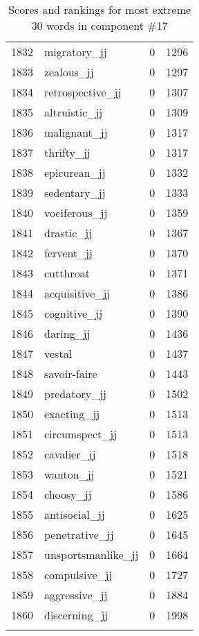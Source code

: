 \begin{longtable}[!htbp]{| rlr@{.}l |}
    1832 & migratory\_jj & 0 & 1296 \\
    1833 & zealous\_jj & 0 & 1297 \\
    1834 & retrospective\_jj & 0 & 1307 \\
    1835 & altruistic\_jj & 0 & 1309 \\
    1836 & malignant\_jj & 0 & 1317 \\
    1837 & thrifty\_jj & 0 & 1317 \\
    1838 & epicurean\_jj & 0 & 1332 \\
    1839 & sedentary\_jj & 0 & 1333 \\
    1840 & vociferous\_jj & 0 & 1359 \\
    1841 & drastic\_jj & 0 & 1367 \\
    1842 & fervent\_jj & 0 & 1370 \\
    1843 & cutthroat & 0 & 1371 \\
    1844 & acquisitive\_jj & 0 & 1386 \\
    1845 & cognitive\_jj & 0 & 1390 \\
    1846 & daring\_jj & 0 & 1436 \\
    1847 & vestal & 0 & 1437 \\
    1848 & savoir-faire & 0 & 1443 \\
    1849 & predatory\_jj & 0 & 1502 \\
    1850 & exacting\_jj & 0 & 1513 \\
    1851 & circumspect\_jj & 0 & 1513 \\
    1852 & cavalier\_jj & 0 & 1518 \\
    1853 & wanton\_jj & 0 & 1521 \\
    1854 & choosy\_jj & 0 & 1586 \\
    1855 & antisocial\_jj & 0 & 1625 \\
    1856 & penetrative\_jj & 0 & 1645 \\
    1857 & unsportsmanlike\_jj & 0 & 1664 \\
    1858 & compulsive\_jj & 0 & 1727 \\
    1859 & aggressive\_jj & 0 & 1884 \\
    1860 & discerning\_jj & 0 & 1998 \\
    \hline
    \caption{Scores and rankings for most extreme 30 words in component \#17} \\
\end{longtable}
